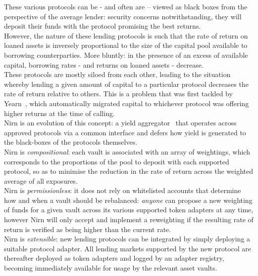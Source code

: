 \documentclass{article}
\begin{document}
\noindent
These various protocols can be - and often are -- viewed as black boxes from the perspective of the average lender: security concerns notwithstanding, they will deposit their funds with the protocol promising the best returns.\\

\noindent
However, the nature of these lending protocols is such that the rate of return on loaned assets is inversely proportional to the size of the capital pool available to borrowing counterparties. More bluntly: in the presence of an excess of available capital, borrowing rates  - and returns on loaned assets - decrease.\\

\noindent
These protocols are mostly siloed from each other, leading to the situation whereby lending a given amount of capital to a particular protocol decreases the rate of return relative to others. This is a problem that was first tackled by Yearn~\cite{yearn}, which automatically migrated capital to whichever protocol was offering higher returns at the time of calling.\\

\noindent
Nirn is an evolution of this concept: a yield aggregator~\cite{cousaert2021sok} that operates across approved protocols via a common interface and defers how yield is generated to the black-boxes of the protocols themselves.\\

\noindent
Nirn is \textit{compositional}: each vault is associated with an array of weightings, which corresponds to the proportions of the pool to deposit with each supported protocol, so as to minimise the reduction in the rate of return across the weighted average of all exposures.\\

\noindent
Nirn is \textit{permissionless}: it does not rely on whitelisted accounts that determine how and when a vault should be rebalanced: \textit{anyone} can propose a new weighting of funds for a given vault across its various supported token adapters at any time, however Nirn will only accept and implement a reweighting if the resulting rate of return is verified as being higher than the current rate.\\

\noindent
Nirn is \textit{extensible}: new lending protocols can be integrated by simply deploying a suitable protocol adapter. All lending markets supported by the new protocol are thereafter deployed as token adapters and logged by an adapter registry, becoming immediately available for usage by the relevant asset vaults.
\end{document}
